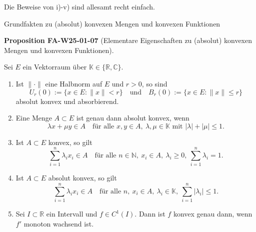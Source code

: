 \documentclass[10pt, letterpaper]{article}
\newcommand{\CustomHeading}[3]{%
  \par\medskip\noindent%
  \textbf{#1 #2} \textnormal{(#3)}.\enskip%
}
\newenvironment{PROP}[2]{\begin{unitbox}\CustomHeading{Proposition}{#1}{#2}}{\end{unitbox}}
\begin{document}
Die Beweise von i)-v) sind allesamt recht einfach.



Grundfakten zu (absolut) konvexen Mengen und konvexen Funktionen

\begin{PROP}{FA-W25-01-07}{Elementare Eigenschaften zu (absolut) konvexen Mengen und konvexen Funktionen}
Sei $E$ ein Vektorraum über $\mathbb{K}\in\{\mathbb{R},\mathbb{C}\}$.
\begin{enumerate}
\item Ist $\|\cdot\|$ eine Halbnorm auf $E$ und $r>0$, so sind
\[
U_{r}(0):=\{x\in E:\|x\|<r\}
\quad\text{und}\quad
B_{r}(0):=\{x\in E:\|x\|\le r\}
\]
absolut konvex und absorbierend.
\item Eine Menge $A\subset E$ ist genau dann absolut konvex, wenn
\[
\lambda x+\mu y\in A \quad\text{für alle }x,y\in A,\ \lambda,\mu\in\mathbb{K}\text{ mit }|\lambda|+|\mu|\le 1.
\]
\item Ist $A\subset E$ konvex, so gilt
\[
\sum_{i=1}^{n}\lambda_i x_i\in A
\quad\text{für alle }n\in\mathbb{N},\ x_i\in A,\ \lambda_i\ge 0,\ \sum_{i=1}^{n}\lambda_i=1.
\]
\item Ist $A\subset E$ absolut konvex, so gilt
\[
\sum_{i=1}^{n}\lambda_i x_i\in A
\quad\text{für alle }n,\ x_i\in A,\ \lambda_i\in\mathbb{K},\ \sum_{i=1}^{n}|\lambda_i|\le 1.
\]
\item Sei $I\subset\mathbb{R}$ ein Intervall und $f\in C^{1}(I)$. 
Dann ist $f$ konvex genau dann, wenn $f'$ monoton wachsend ist.
\end{enumerate}
\end{PROP}
\end{document}
